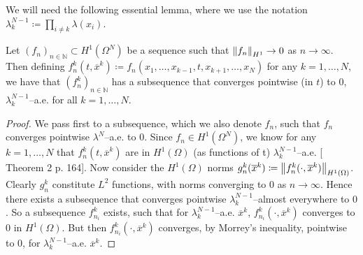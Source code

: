 We will need the following essential lemma, where we use the notation  $ \lambda_k^{N-1}\coloneqq \prod_{i\neq k}\lambda(x_i) $.
\begin{lemma}\label{LemmaH1PointwiseConvergence}
	Let $ (f_n)_{n\in\mathbb{N}}\subset H^1(\Omega^N) $ be a sequence such that $ \left\lVert f_n \right\rVert_{H^1}\to0 $ as $ n\to\infty $. Then defining $ f^k_n(t,\overline{x}^k)\coloneqq f_n(x_1,\ldots,x_{k-1},t,x_{k+1},\ldots,x_N) $ for any $ k=1,\ldots,N $, we have that $ (f^k_n)_{n\in\mathbb{N}} $ has a subsequence that converges pointwise (in $ t $) to $ 0 $, $ \lambda_k^{N-1} $--a.e. for all $ k=1,\ldots,N $.
\end{lemma}
\begin{proof}
	We pass first to a subsequence, which we also denote $ f_n$, such that $ f_n $ converges pointwise $ \lambda^N $--a.e. to $ 0 $. 
	Since $ f_n\in H^1(\Omega^N) $, we know for any $ k=1,\ldots,N $ that $ f^k_n(t,\overline{x}^k) $ are in $ H^1(\Omega) $ (as functions of t) $ \lambda_k^{N-1} $--a.e.
	[\cite{evans1991measure} Theorem 2 p. 164].
	Now consider the $ H^1(\Omega) $ norms $ g_n^k(\overline{x}^k)\coloneqq \left\lVert f^k_n(\cdot,\overline{x}^k) \right\rVert_{H^1(\Omega)} $. Clearly $ g_n^k $ constitute $ L^2 $ functions, with norms converging to $ 0 $ as $ n\to\infty $. Hence there exists a subsequence that converges pointwise $ \lambda_k^{N-1} $--almost everywhere to $ 0 $. So a subsequence $ f_{n_i}^k $ exists, such that for $ \lambda_k^{N-1} $--a.e. $ \overline{x}^k $, $ f_{n_i}^k(\cdot,\overline{x}^k) $ converges to $ 0 $ in $ H^1(\Omega) $. But then $  f_{n_i}^k(\cdot,\overline{x}^k) $ converges, by Morrey's inequality, pointwise to $ 0 $, for $ \lambda_k^{N-1} $--a.e. $ \overline{x}^k $.
\end{proof}

